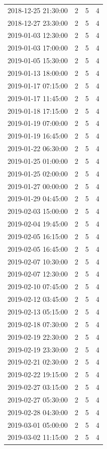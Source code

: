 \begin{tabular}{lrrr}
2018-12-25 21:30:00 & 2 & 5 & 4 \\
2018-12-27 23:30:00 & 2 & 5 & 4 \\
2019-01-03 12:30:00 & 2 & 5 & 4 \\
2019-01-03 17:00:00 & 2 & 5 & 4 \\
2019-01-05 15:30:00 & 2 & 5 & 4 \\
2019-01-13 18:00:00 & 2 & 5 & 4 \\
2019-01-17 07:15:00 & 2 & 5 & 4 \\
2019-01-17 11:45:00 & 2 & 5 & 4 \\
2019-01-18 17:15:00 & 2 & 5 & 4 \\
2019-01-19 07:00:00 & 2 & 5 & 4 \\
2019-01-19 16:45:00 & 2 & 5 & 4 \\
2019-01-22 06:30:00 & 2 & 5 & 4 \\
2019-01-25 01:00:00 & 2 & 5 & 4 \\
2019-01-25 02:00:00 & 2 & 5 & 4 \\
2019-01-27 00:00:00 & 2 & 5 & 4 \\
2019-01-29 04:45:00 & 2 & 5 & 4 \\
2019-02-03 15:00:00 & 2 & 5 & 4 \\
2019-02-04 19:45:00 & 2 & 5 & 4 \\
2019-02-05 16:15:00 & 2 & 5 & 4 \\
2019-02-05 16:45:00 & 2 & 5 & 4 \\
2019-02-07 10:30:00 & 2 & 5 & 4 \\
2019-02-07 12:30:00 & 2 & 5 & 4 \\
2019-02-10 07:45:00 & 2 & 5 & 4 \\
2019-02-12 03:45:00 & 2 & 5 & 4 \\
2019-02-13 05:15:00 & 2 & 5 & 4 \\
2019-02-18 07:30:00 & 2 & 5 & 4 \\
2019-02-19 22:30:00 & 2 & 5 & 4 \\
2019-02-19 23:30:00 & 2 & 5 & 4 \\
2019-02-21 02:30:00 & 2 & 5 & 4 \\
2019-02-22 19:15:00 & 2 & 5 & 4 \\
2019-02-27 03:15:00 & 2 & 5 & 4 \\
2019-02-27 05:30:00 & 2 & 5 & 4 \\
2019-02-28 04:30:00 & 2 & 5 & 4 \\
2019-03-01 05:00:00 & 2 & 5 & 4 \\
2019-03-02 11:15:00 & 2 & 5 & 4 \\

\end{tabular}

